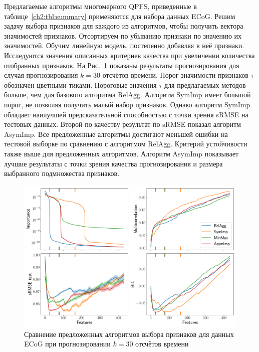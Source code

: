 Предлагаемые алгоритмы многомерного QPFS, приведенные в таблице~\ref{ch2:tbl:summary} применяются для набора данных ECoG. 
Решим задачу выбора признаков для каждого из алгоритмов, чтобы получить вектора значимостей признаков. 
Отсортируем по убыванию признаки по значению их значимостей. Обучим линейную модель, постепенно добавляя в неё признаки. 
Исследуются значения описанных критериев качества при увеличении количества отобранных признаков. 
На Рис.~\ref{ch2:fig:ecog_3_30_metrics} показаны результаты прогнозирования для случая прогнозирования $k = 30$ отсчётов времени. 
Порог значимости признаков $\tau$ обозначен цветными тиками. 
Пороговые значения $\tau$ для предлагаемых методов больше, чем для базового алгоритма RelAgg. 
Алгоритм SymImp имеет большой порог, не позволяя получить малый набор признаков.
Однако алгоритм SymImp обладает наилучшей предсказательной способностью с точки зрения sRMSE на тестовых данных.
Второй по качеству результат по sRMSE показал алгоритм AsymImp.
Все предложенные алгоритмы достигают меньшей ошибки на тестовой выборке по сравнению с алгоритмом RelAgg. 
Критерий устойчивости также выше для предложенных алгоритмов.
Алгоритм AsymImp показывает лучшие результаты с точки зрения качества прогнозирования и размера выбранного подмножества признаков.

\begin{figure}[ht]
	\includegraphics[width=\linewidth]{figs/ch2/ecog_3_30_metrics}
	\caption{Сравнение предложенных алгоритмов выбора признаков для данных ECoG при прогнозировании $k = 30$ отсчётов времени}
	\label{ch2:fig:ecog_3_30_metrics}
\end{figure}

